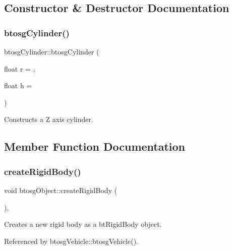 \subsection{Constructor \& Destructor Documentation}
\mbox{\label{classbtosgCylinder_a85e2517d8fd8a16ad7514f2f70cc1086}} 
\subsubsection{\texorpdfstring{btosg\+Cylinder()}{btosgCylinder()}}
{\footnotesize\ttfamily btosg\+Cylinder\+::btosg\+Cylinder (\begin{DoxyParamCaption}\item[{float}]{r = {},  }\item[{float}]{h = {} }\end{DoxyParamCaption})\hspace{0.3cm}{\ttfamily [inline]}}

Constructs a Z axis cylinder. 

\subsection{Member Function Documentation}
\mbox{\label{classbtosgObject_a029dbe9134fa94e7355799f67fb2cd6d}} 
\subsubsection{\texorpdfstring{create\+Rigid\+Body()}{createRigidBody()}}
{\footnotesize\ttfamily void btosg\+Object\+::create\+Rigid\+Body (\begin{DoxyParamCaption}{ }\end{DoxyParamCaption})\hspace{0.3cm}{\ttfamily [inline]}, {\ttfamily [inherited]}}

Creates a new rigid body as a bt\+Rigid\+Body object. 

Referenced by btosg\+Vehicle\+::btosg\+Vehicle().

\mbox{\label{classbtosgObject_a2019ec63bde02b72600450c7c985e77a}} 

